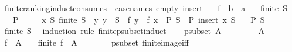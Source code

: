 \begin{isabellebody}
\isanewline
{}\isamarkupfalse%
\ finite{\isacharunderscore}{\kern0pt}ranking{\isacharunderscore}{\kern0pt}induct{\isacharbrackleft}{\kern0pt}consumes\ {}{\isacharcomma}{\kern0pt}\ case{\isacharunderscore}{\kern0pt}names\ empty\ insert{\isacharbrackright}{\kern0pt}{\isacharcolon}{\kern0pt}\isanewline
\ \ \ f\ {\isacharcolon}{\kern0pt}{\isacharcolon}{\kern0pt}\ {\isachardoublequoteopen}{\isacharprime}{\kern0pt}b\ {\isasymRightarrow}\ {\isacharprime}{\kern0pt}a{\isachardoublequoteclose}\isanewline
\ \ \ {\isachardoublequoteopen}finite\ S{\isachardoublequoteclose}\isanewline
\ \ \ {\isachardoublequoteopen}P\ {\isacharbraceleft}{\kern0pt}{\isacharbraceright}{\kern0pt}{\isachardoublequoteclose}\ \isanewline
\ \ \ {\isachardoublequoteopen}{\isasymAnd}x\ S{\isachardot}{\kern0pt}\ finite\ S\ {\isasymLongrightarrow}\ {\isacharparenleft}{\kern0pt}{\isasymAnd}y{\isachardot}{\kern0pt}\ y\ {\isasymin}\ S\ {\isasymLongrightarrow}\ f\ y\ {\isasymle}\ f\ x{\isacharparenright}{\kern0pt}\ {\isasymLongrightarrow}\ P\ S\ {\isasymLongrightarrow}\ P\ {\isacharparenleft}{\kern0pt}insert\ x\ S{\isacharparenright}{\kern0pt}{\isachardoublequoteclose}\isanewline
\ \ \ {\isachardoublequoteopen}P\ S{\isachardoublequoteclose}\isanewline
%
\isadelimproof
\ \ %
\endisadelimproof
%
\isatagproof
{}\isamarkupfalse%
\ {\isacartoucheopen}finite\ S{\isacartoucheclose}\ \isanewline
{}\isamarkupfalse%
\ {\isacharparenleft}{\kern0pt}induction\ rule{\isacharcolon}{\kern0pt}\ finite{\isacharunderscore}{\kern0pt}psubset{\isacharunderscore}{\kern0pt}induct{\isacharparenright}{\kern0pt}\isanewline
\ \ \isamarkupfalse%
\ {\isacharparenleft}{\kern0pt}psubset\ A{\isacharparenright}{\kern0pt}\isanewline
\ \ \isacommand{{\isacharbraceleft}{\kern0pt}}\isamarkupfalse%
\isanewline
\ \ \ \ \isamarkupfalse%
\ {\isachardoublequoteopen}A\ {\isasymnoteq}\ {\isacharbraceleft}{\kern0pt}{\isacharbraceright}{\kern0pt}{\isachardoublequoteclose}\isanewline
\ \ \ \ \isamarkupfalse%
\ {\isachardoublequoteopen}f\ {\isacharbackquote}{\kern0pt}\ A\ {\isasymnoteq}\ {\isacharbraceleft}{\kern0pt}{\isacharbraceright}{\kern0pt}{\isachardoublequoteclose}\ \ {\isachardoublequoteopen}finite\ {\isacharparenleft}{\kern0pt}f\ {\isacharbackquote}{\kern0pt}\ A{\isacharparenright}{\kern0pt}{\isachardoublequoteclose}\isanewline
\ \ \ \ \ \ \isamarkupfalse%
\ psubset\ finite{\isacharunderscore}{\kern0pt}image{\isacharunderscore}{\kern0pt}iff\ \isamarkupfalse%

\end{isabellebody}
